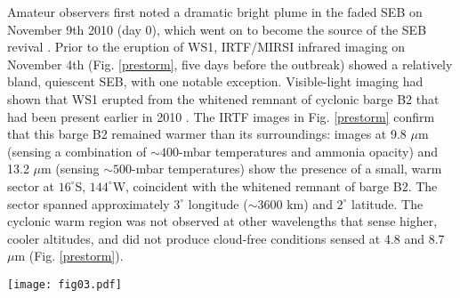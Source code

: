 \documentclass[final,authoryear,5p,times,twocolumn]{elsarticle}
\begin{document}
Amateur observers first noted a dramatic bright plume in the faded SEB on November 9th 2010 (day 0), which went on to become the source of the SEB revival \citep[white spot 1, WS1 at $15.1\pm0.2^\circ$S and $148^\circ$W,][]{11rogers_21, 16rogers}.  Prior to the eruption of WS1, IRTF/MIRSI infrared imaging on November 4th (Fig. \ref{prestorm}, five days before the outbreak) showed a relatively bland, quiescent SEB, with one notable exception.  Visible-light imaging had shown that WS1 erupted from the whitened remnant of cyclonic barge B2 that had been present earlier in 2010 \citep{11rogers_21, 12perezhoyos, 16rogers}.  The IRTF images in Fig. \ref{prestorm} confirm that this barge B2 remained warmer than its surroundings:  images at 9.8 $\mu$m (sensing a combination of $\sim400$-mbar temperatures and ammonia opacity) and 13.2 $\mu$m (sensing $\sim500$-mbar temperatures) show the presence of a small, warm sector at $16^\circ$S, $144^\circ$W, coincident with the whitened remnant of barge B2.  The sector spanned approximately $3^\circ$ longitude ($\sim3600$ km) and $2^\circ$ latitude. The cyclonic warm region was not observed at other wavelengths that sense higher, cooler altitudes, and did not produce cloud-free conditions sensed at 4.8 and 8.7 $\mu$m (Fig. \ref{prestorm}).

\begin{figure*}
\begin{centering}
\centerline{\texttt{[image: fig03.pdf]}}
\caption{Survey of the faded SEB in IRTF/MIRSI imaging on November 4th 2010, five days before the outbreak at $148^\circ$W.  The 17.2 $\mu$m image is representative of similar images at 17.9, 18.4, 20.3 and 24.8 $\mu$m.  A warm spot is visible in the SEB near $144^\circ$W in the 9.8 and 13.2-$\mu$m filters (as indicated by the yellow lines), confirming the continued presence of a warm cyclonic barge immediately prior to the eruption.}
\label{prestorm}
\end{centering}
\end{figure*}
\end{document}
